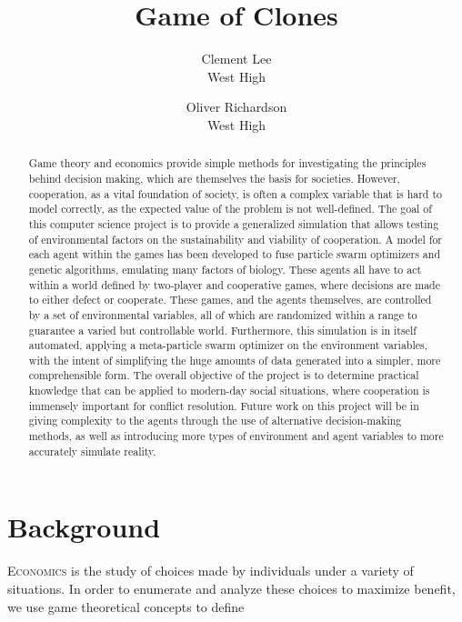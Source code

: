 \documentclass{article}
\begin{document}
\title{\Huge{Game of Clones}}
\author{Clement Lee\\
West High\and
Oliver Richardson\\
West High}
\maketitle

\begin{abstract}
Game theory and economics provide simple methods for investigating the principles behind decision making, which are themselves the basis for societies. However, cooperation, as a vital foundation of society, is often a complex variable that is hard to model correctly, as the expected value of the problem is not well-defined. The goal of this computer science project is to provide a generalized simulation that allows testing of environmental factors on the sustainability and viability of cooperation. A model for each agent within the games has been developed to fuse particle swarm optimizers and genetic algorithms, emulating many factors of biology. These agents all have to act within a world defined by two-player and cooperative games, where decisions are made to either defect or cooperate. These games, and the agents themselves, are controlled by a set of environmental variables, all of which are randomized within a range to guarantee a varied but controllable world. Furthermore, this simulation is in itself automated, applying a meta-particle swarm optimizer on the environment variables, with the intent of simplifying the huge amounts of data generated into a simpler, more comprehensible form. The overall objective of the project is to determine practical knowledge that can be applied to modern-day social situations, where cooperation is immensely important for conflict resolution. Future work on this project will be in giving complexity to the agents through the use of alternative decision-making methods, as well as introducing more types of environment and agent variables to more accurately simulate reality.
\end{abstract}

\section*{Background\dotfill}
\lettrine{E}{conomics} is the study of choices made by individuals under a variety of situations. In order to enumerate and analyze these choices to maximize benefit, we use game theoretical concepts to define 
\end{document}
